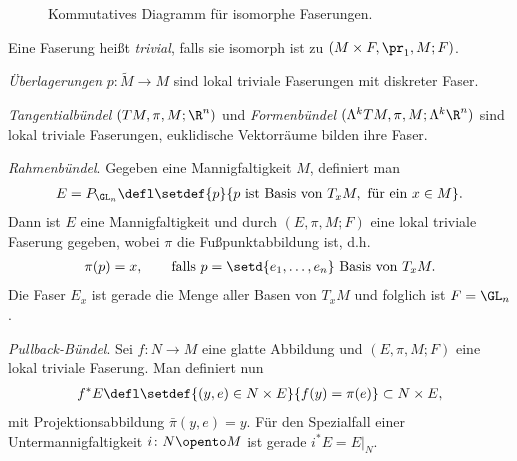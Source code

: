 \documentclass[%
	paper=a5,%
	fleqn,%
	DIV=18,%
	BCOR=0mm,
	fontsize=11pt,
	titlepage=false,%
	bibliography=totoc,
	DIV=18,%
	twoside=true,
	pdftitle=Riemannsche Geometrie,
	pdfauthor=Uwe Semmelmann,
	numbers=noendperiod]%
	{scrbook}
\begin{document}
\begin{figure}
\centering
{}
\caption{Kommutatives Diagramm für isomorphe Faserungen.}
\end{figure}


\begin{rem}
Eine Faserung heißt \emph{trivial}, falls sie isomorph ist zu $(M\times
F,\pr_1,M;F)$.
\end{rem}

\begin{ex}
\begin{exenum}
\item \textit{Überlagerungen} $p\colon \tilde{M}\to M$ sind lokal triviale
Faserungen mit diskreter Faser.
\item \textit{Tangentialbündel} $(TM,\pi,M;\R^n)$ und
\textit{Formenbündel} $(\Lambda^k TM,\pi,M;\Lambda^k\R^n)$ sind lokal triviale
Faserungen, euklidische Vektorräume bilden ihre Faser.
\item {}\textit{Rahmenbündel}. Gegeben eine Mannigfaltigkeit
$M$, definiert man
\begin{align*}
E = P_{\GL_n} \defl
\setdef{p}{p\text{ ist Basis von }T_xM,\text{ für ein }x\in M}.
\end{align*}
Dann ist $E$ eine Mannigfaltigkeit und durch $(E,\pi,M;F)$ eine lokal triviale
Faserung gegeben, wobei $\pi$ die Fußpunktabbildung ist, d.h.
\begin{align*}
\pi(p) = x,\qquad \text{falls } p = \setd{e_1,\ldots,e_n} \text{ Basis von
}T_xM.
\end{align*}
Die Faser $E_x$ ist gerade die Menge aller Basen von $T_xM$ und folglich ist $F
= \GL_n$.
\item {}\textit{Pullback-Bündel}. Sei $f\colon N\to M$ eine
glatte Abbildung und $(E,\pi,M;F)$ eine lokal triviale Faserung. Man definiert nun
\begin{align*}
f^*E \defl \setdef{(y,e)\in N\times E}{f(y) = \pi(e)} \subset N\times E, 
\end{align*}
mit Projektionsabbildung $\bar{\pi}(y,e) = y$.
Für den Spezialfall einer Untermannigfaltigkeit $i\colon N\opento M$ ist gerade $i^*E
= E\big|_N$.\boxc
\end{exenum}
\end{ex}
\end{document}
